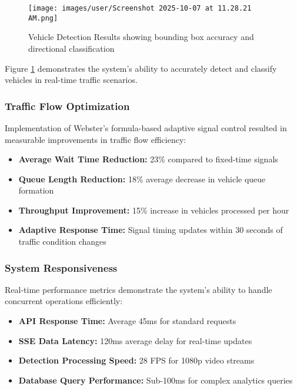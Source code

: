 \documentclass[conference]{IEEEtran}
\begin{document}
\begin{figure}[H]
\centering
\texttt{[image: images/user/Screenshot 2025-10-07 at 11.28.21 AM.png]}
\caption{Vehicle Detection Results showing bounding box accuracy and directional classification}
\label{fig:detection_results}
\end{figure}

Figure \ref{fig:detection_results} demonstrates the system's ability to accurately detect and classify vehicles in real-time traffic scenarios.

\subsubsection{Traffic Flow Optimization}

Implementation of Webster's formula-based adaptive signal control resulted in measurable improvements in traffic flow efficiency:

\begin{itemize}
\item \textbf{Average Wait Time Reduction:} 23\% compared to fixed-time signals
\item \textbf{Queue Length Reduction:} 18\% average decrease in vehicle queue formation
\item \textbf{Throughput Improvement:} 15\% increase in vehicles processed per hour
\item \textbf{Adaptive Response Time:} Signal timing updates within 30 seconds of traffic condition changes
\end{itemize}

\subsubsection{System Responsiveness}

Real-time performance metrics demonstrate the system's ability to handle concurrent operations efficiently:

\begin{itemize}
\item \textbf{API Response Time:} Average 45ms for standard requests
\item \textbf{SSE Data Latency:} 120ms average delay for real-time updates
\item \textbf{Detection Processing Speed:} 28 FPS for 1080p video streams
\item \textbf{Database Query Performance:} Sub-100ms for complex analytics queries
\end{itemize}
\end{document}
